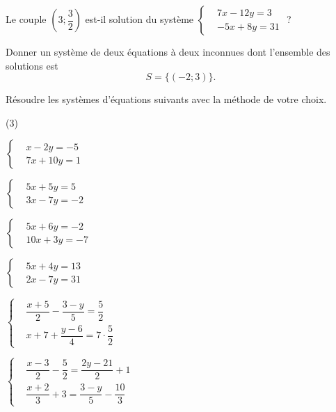 \documentclass[a4paper,12pt]{report}
\begin{document}
\begin{exo}[1]
Le couple $\left(3 ; \dfrac{3}{2}\right)$ est-il solution du système $  \left\{
    \begin{aligned}
      & 7x - 12y = 3 \\
      & -5x + 8y = 31
    \end{aligned}
  \right.$ ?	
\end{exo}

\begin{exo}[1]
	Donner un système de deux équations à deux inconnues dont l'ensemble des solutions est \[S=\{(-2 ; 3)\}.\]
\end{exo}
\begin{exo}[2]
	Résoudre les systèmes d'équations suivants avec la méthode de votre choix. 
	\begin{tasks}(3)
		
\task
$
  \left\{
    \begin{aligned}
      & x - 2y = -5 \\
      & 7x + 10y = 1
    \end{aligned}
  \right.
$

\task
$
  \left\{
    \begin{aligned}
      & 5x + 5y = 5 \\
      & 3x - 7y = -2
    \end{aligned}
  \right.
$

\task
$
  \left\{
    \begin{aligned}
      & 5x + 6y = -2 \\
      & 10x + 3y = -7
    \end{aligned}
  \right.
$

\task
$
  \left\{
    \begin{aligned}
      & 5x + 4y = 13 \\
      & 2x - 7y = 31
    \end{aligned}
    \right.$

\task
$
  \left\{
    \begin{aligned}
      & \dfrac{x+5}{2} - \dfrac{3 - y}{5} = \dfrac{5}{2} \\
      & x + 7 + \dfrac{y - 6}{4} = 7 \cdot \dfrac{5}{2}
    \end{aligned}
  \right.
$

\task
$
  \left\{
    \begin{aligned}
      & \dfrac{x-3}{2} - \dfrac{5}{2} = \dfrac{2y - 21}{2} + 1 \\
      & \dfrac{x + 2}{3} + 3 = \dfrac{3 - y}{5} - \dfrac{10}{3}
    \end{aligned}
  \right.
$
\end{tasks}
\end{exo}
\end{document}
